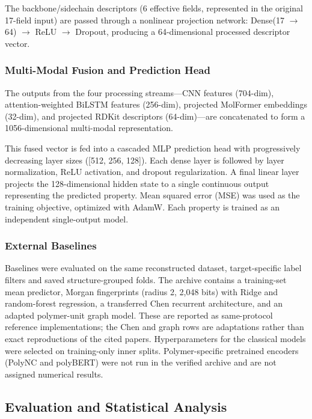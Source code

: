 \documentclass{article}
\begin{document}
The backbone/sidechain descriptors (6 effective fields, represented in the original 17-field input) are passed through a nonlinear projection network: Dense(17 $\rightarrow$ 64) $\rightarrow$ ReLU $\rightarrow$ Dropout, producing a 64-dimensional processed descriptor vector.

\subsubsection{Multi-Modal Fusion and Prediction Head}

The outputs from the four processing streams---CNN features (704-dim), attention-weighted BiLSTM features (256-dim), projected MolFormer embeddings (32-dim), and projected RDKit descriptors (64-dim)---are concatenated to form a 1056-dimensional multi-modal representation.

This fused vector is fed into a cascaded MLP prediction head with progressively decreasing layer sizes ([512, 256, 128]). Each dense layer is followed by layer normalization, ReLU activation, and dropout regularization. A final linear layer projects the 128-dimensional hidden state to a single continuous output representing the predicted property. Mean squared error (MSE) was used as the training objective, optimized with AdamW. Each property is trained as an independent single-output model.

\subsubsection{External Baselines}

Baselines were evaluated on the same reconstructed dataset, target-specific label filters and saved structure-grouped folds. The archive contains a training-set mean predictor, Morgan fingerprints (radius 2, 2,048 bits) with Ridge and random-forest regression, a transferred Chen recurrent architecture, and an adapted polymer-unit graph model. These are reported as same-protocol reference implementations; the Chen and graph rows are adaptations rather than exact reproductions of the cited papers. Hyperparameters for the classical models were selected on training-only inner splits. Polymer-specific pretrained encoders (PolyNC and polyBERT) were not run in the verified archive and are not assigned numerical results.

\subsection{Evaluation and Statistical Analysis}
\end{document}
